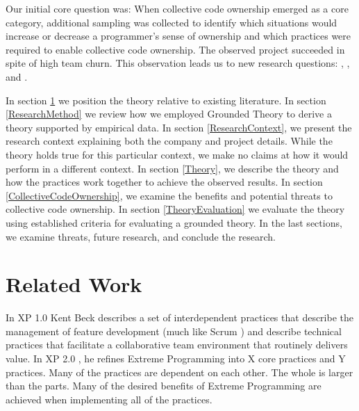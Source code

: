 Our initial core question was:  When collective code ownership emerged as a core category, additional sampling was collected to identify which situations would increase or decrease a programmer's sense of ownership and which practices were required to enable collective code ownership. The observed project succeeded in spite of high team churn. This observation leads us to new research questions: , ,  and . 

In section \ref{RelatedWork} we position the theory relative to existing literature. In section \ref{ResearchMethod} we review how we employed Grounded Theory to derive a theory supported by empirical data. In section \ref{ResearchContext}, we present the research context explaining both the company and project details. While the theory holds true for this particular context, we make no claims at how it would perform in a different context. In section \ref{Theory}, we describe the theory and how the practices work together to achieve the observed results. In section \ref{CollectiveCodeOwnership}, we examine the benefits and potential threats to collective code ownership. In section \ref{TheoryEvaluation} we evaluate the theory using established criteria for evaluating a grounded theory. In the last sections, we examine threats, future research, and conclude the research.
\section{Related Work}
\label{RelatedWork}

In XP 1.0 \cite{ExtremeProgramming2000} Kent Beck describes a set of interdependent practices that describe the management of feature development (much like Scrum \cite{Schwaber2001}) and describe technical practices that facilitate a collaborative team environment that routinely delivers value. In XP 2.0 \cite{ExtremeProgramming2004}, he refines Extreme Programming into X core practices and Y practices. Many of the practices are dependent on each other. The whole is larger than the parts. Many of  the desired benefits of Extreme Programming are achieved when implementing all of the practices. 

